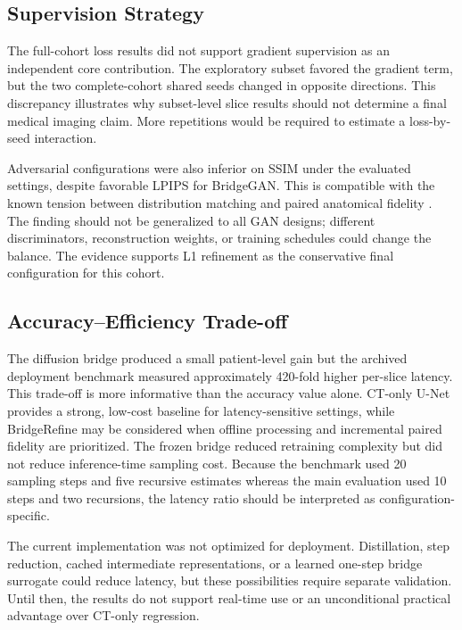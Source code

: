 \subsection{Supervision Strategy}

The full-cohort loss results did not support gradient supervision as an independent core contribution. The exploratory subset favored the gradient term, but the two complete-cohort shared seeds changed in opposite directions. This discrepancy illustrates why subset-level slice results should not determine a final medical imaging claim. More repetitions would be required to estimate a loss-by-seed interaction.

Adversarial configurations were also inferior on SSIM under the evaluated settings, despite favorable LPIPS for BridgeGAN. This is compatible with the known tension between distribution matching and paired anatomical fidelity \cite{cohen2018hallucination}. The finding should not be generalized to all GAN designs; different discriminators, reconstruction weights, or training schedules could change the balance. The evidence supports L1 refinement as the conservative final configuration for this cohort.

\subsection{Accuracy--Efficiency Trade-off}

The diffusion bridge produced a small patient-level gain but the archived deployment benchmark measured approximately 420-fold higher per-slice latency. This trade-off is more informative than the accuracy value alone. CT-only U-Net provides a strong, low-cost baseline for latency-sensitive settings, while BridgeRefine may be considered when offline processing and incremental paired fidelity are prioritized. The frozen bridge reduced retraining complexity but did not reduce inference-time sampling cost. Because the benchmark used 20 sampling steps and five recursive estimates whereas the main evaluation used 10 steps and two recursions, the latency ratio should be interpreted as configuration-specific.

The current implementation was not optimized for deployment. Distillation, step reduction, cached intermediate representations, or a learned one-step bridge surrogate could reduce latency, but these possibilities require separate validation. Until then, the results do not support real-time use or an unconditional practical advantage over CT-only regression.

